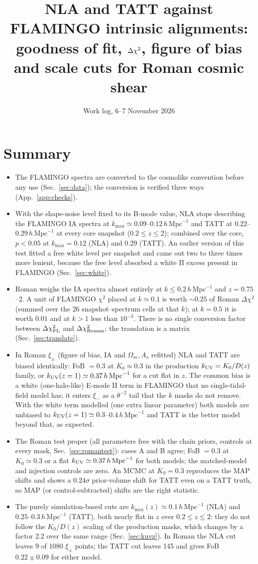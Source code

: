 \documentclass[11pt]{article}
\title{NLA and TATT against FLAMINGO intrinsic alignments:\\ goodness of fit, $\dchi$, figure of bias and scale cuts for Roman cosmic shear}
\author{Work log, 6--7 November 2026}
\date{}
\newcommand{\hmpc}{\,h\,\mathrm{Mpc}^{-1}}
\newcommand{\dchi}{\Delta\chi^2}
\begin{document}
\maketitle

\section*{Summary}
\begin{itemize}
\item The FLAMINGO spectra are converted to the cosmolike convention before any use (Sec.~\ref{sec:data}); the conversion is verified three ways (App.~\ref{app:checks}).
\item With the shape-noise level fixed to its B-mode value, NLA stops describing the FLAMINGO IA spectra at $k_{\max}\simeq0.09$--$0.12\hmpc$ and TATT at $0.22$--$0.29\hmpc$ at every core snapshot ($0.2\le z\le2$); combined over the core, $p<0.05$ at $k_{\max}=0.12$ (NLA) and $0.29$ (TATT). An earlier version of this test fitted a free white level per snapshot and came out two to three times more lenient, because the free level absorbed a white II excess present in FLAMINGO (Sec.~\ref{sec:white}).
\item Roman weighs the IA spectra almost entirely at $k\le0.2\hmpc$ and $z=0.75$--$2$. A unit of FLAMINGO $\chi^2$ placed at $k\simeq0.1$ is worth $\sim0.25$ of Roman $\dchi$ (summed over the 26 snapshot--spectrum cells at that $k$); at $k=0.5$ it is worth $0.01$ and at $k>1$ less than $10^{-3}$. There is no single conversion factor between $\dchi_{\rm FL}$ and $\dchi_{\rm Roman}$; the translation is a matrix (Sec.~\ref{sec:translate}).
\item In Roman $\xi_\pm$ (figure of bias, IA and $\Omega_m,A_s$ refitted) NLA and TATT are biased identically: FoB $=0.3$ at $K_0\simeq0.3$ in the production $k_{\rm UV}=K_0/D(z)$ family, or $k_{\rm UV}(z=1)\simeq0.37\hmpc$ for a cut flat in $z$. The common bias is a white (one-halo-like) E-mode II term in FLAMINGO that no single-tidal-field model has; it enters $\xi_-$ as a $\theta^{-2}$ tail that the $k$ masks do not remove. With the white term modelled (one extra linear parameter) both models are unbiased to $k_{\rm UV}(z=1)\simeq0.3$--$0.4\hmpc$ and TATT is the better model beyond that, as expected.
\item The Roman test proper (all parameters free with the chain priors, controls at every mask, Sec.~\ref{sec:romantest}): cases A and B agree; FoB $=0.3$ at $K_0\simeq0.3$ or a flat $k_{\rm UV}\simeq0.37\hmpc$ for both models; the matched-model and injection controls are zero. An MCMC at $K_0=0.3$ reproduces the MAP shifts and shows a $0.24\sigma$ prior-volume shift for TATT even on a TATT truth, so MAP (or control-subtracted) shifts are the right statistic.
\item The purely simulation-based cuts are $k_{\max}(z)\simeq0.1\hmpc$ (NLA) and $0.25$--$0.3\hmpc$ (TATT), both nearly flat in $z$ over $0.2\le z\le2$: they do not follow the $K_0/D(z)$ scaling of the production masks, which changes by a factor 2.2 over the same range (Sec.~\ref{sec:kuvz}). In Roman the NLA cut leaves 9 of 1080 $\xi_\pm$ points; the TATT cut leaves 145 and gives FoB $0.22\pm0.09$ for either model.
\end{itemize}
\end{document}
